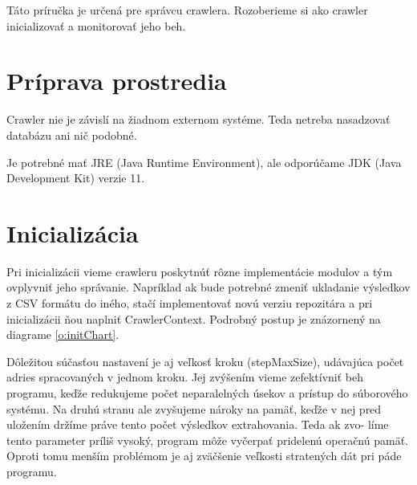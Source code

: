 


Táto príručka je určená pre správcu crawlera. Rozoberieme si ako crawler inicializovať a monitorovať jeho beh.

\section{Príprava prostredia}
Crawler nie je závislí na žiadnom externom systéme. Teda netreba nasadzovať databázu ani nič podobné. 

Je potrebné mať JRE (Java Runtime Environment), ale odporúčame JDK (Java Development Kit) verzie 11. 

\section{Inicializácia}
Pri inicializácii vieme crawleru poskytnúť rôzne implementácie modulov a tým ovplyvniť jeho správanie. Napríklad ak bude potrebné zmeniť ukladanie výsledkov z CSV formátu do iného, stačí implementovať novú verziu repozitára a pri inicializácii ňou naplniť CrawlerContext. Podrobný postup je znázornený na diagrame \ref{o:initChart}.

Dôležitou súčasťou nastavení je aj veľkosť kroku (stepMaxSize), udávajúca počet adries spracovaných v jednom kroku. Jej zvýšením vieme zefektívniť beh programu, keďže redukujeme počet neparalelných úsekov a prístup do súborového systému. Na druhú stranu ale zvyšujeme nároky na pamäť, keďže v nej pred uložením držíme práve tento počet výsledkov extrahovania. Teda ak zvo-
líme tento parameter príliš vysoký, program môže vyčerpať pridelenú operačnú pamäť. Oproti tomu menším problémom je aj zväčšenie veľkosti stratených dát pri páde programu.

